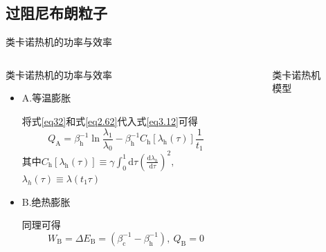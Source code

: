 \documentclass{beamer}
\newcommand{\DD}[2]{\frac{\mathrm{d} #1}{\mathrm{d} #2}}
\begin{document}
\subsection{过阻尼布朗粒子}
\begin{frame}{类卡诺热机的功率与效率}
    \begin{columns}
        \begin{column}{.7\textwidth}
            \begin{block}{类卡诺热机的功率与效率}
            \begin{itemize}
            \item A.等温膨胀

            将式\eqref{eq32}和式\eqref{eq2.62}代入式\eqref{eq3.12}可得
            \begin{equation}
                Q_{\mathrm{A}} = \beta_{\mathrm{h}}^{-1} \ln{\frac{\lambda_1}{\lambda_0}} - \beta_{\mathrm{h}}^{-1} C_{\mathrm{h}} [\lambda_{\mathrm{h}}(\tau)] \frac{1}{t_1}     
                \label{eq3.16}
            \end{equation}
            其中$C_{\mathrm{h}} [\lambda_{\mathrm{h}}(\tau)] \equiv \gamma \int_{0}^{1} \mathrm{d} \tau \left(\DD{\lambda_{h}}{\tau}\right)^2,$ $\lambda_{h}(\tau)\equiv\lambda({t_1 \tau})$
            \item B.绝热膨胀
            
            同理可得
            \begin{equation}
                W_{\mathrm{B}} = \Delta E_{\mathrm{B}} = (\beta_{\mathrm{c}}^{-1} - \beta_{\mathrm{h}}^{-1}),\  Q_{\mathrm{B}}=0
                \label{eq3.17}
            \end{equation}
            \end{itemize}
            \end{block}          
        \end{column}
        \begin{column}{.4\textwidth}
        \begin{figure}
            \centering
            \def\svgwidth{\columnwidth}
            
            \setcounter{figure}{2}
            \caption{类卡诺热机模型}
            \end{figure}
        \end{column}   
    \end{columns}
\end{frame}
\end{document}
